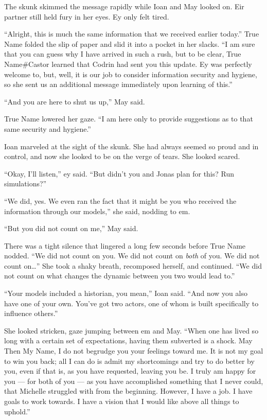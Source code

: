 The skunk skimmed the message rapidly while Ioan and May looked on. Eir partner still held fury in her eyes. Ey only felt tired.

``Alright, this is much the same information that we received earlier today.'' True Name folded the slip of paper and slid it into a pocket in her slacks. ``I am sure that you can guess why I have arrived in such a rush, but to be clear, True Name\#Castor learned that Codrin had sent you this update. Ey was perfectly welcome to, but, well, it is our job to consider information security and hygiene, so she sent us an additional message immediately upon learning of this.''

``And you are here to shut us up,'' May said.

True Name lowered her gaze. ``I am here only to provide suggestions as to that same security and hygiene.''

Ioan marveled at the sight of the skunk. She had always seemed so proud and in control, and now she looked to be on the verge of tears. She looked scared.

``Okay, I'll listen,'' ey said. ``But didn't you and Jonas plan for this? Run simulations?''

``We did, yes. We even ran the fact that it might be you who received the information through our models,'' she said, nodding to em.

``But you did not count on me,'' May said.

There was a tight silence that lingered a long few seconds before True Name nodded. ``We did not count on you. We did not count on \emph{both} of you. We did not count on\ldots{}'' She took a shaky breath, recomposed herself, and continued. ``We did not count on what changes the dynamic between you two would lead to.''

``Your models included a historian, you mean,'' Ioan said. ``And now you also have one of your own. You've got two actors, one of whom is built specifically to influence others.''

She looked stricken, gaze jumping between em and May. ``When one has lived so long with a certain set of expectations, having them subverted is a shock. May Then My Name, I do not begrudge you your feelings toward me. It is not my goal to win you back; all I can do is admit my shortcomings and try to do better by you, even if that is, as you have requested, leaving you be. I truly am happy for you — for both of you — as you have accomplished something that I never could, that Michelle struggled with from the beginning. However, I have a job. I have goals to work towards. I have a vision that I would like above all things to uphold.''

